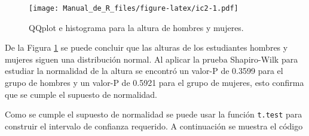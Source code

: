 \documentclass[10pt,]{krantz}
\makeatletter
\newenvironment{Shaded}{\begin{snugshade}}{\end{snugshade}}
\newcommand{\KeywordTok}[1]{\textcolor[rgb]{0.13,0.29,0.53}{\textbf{{#1}}}}
\newcommand{\DataTypeTok}[1]{\textcolor[rgb]{0.13,0.29,0.53}{{#1}}}
\newcommand{\DecValTok}[1]{\textcolor[rgb]{0.00,0.00,0.81}{{#1}}}
\newcommand{\StringTok}[1]{\textcolor[rgb]{0.31,0.60,0.02}{{#1}}}
\newcommand{\CommentTok}[1]{\textcolor[rgb]{0.56,0.35,0.01}{\textit{{#1}}}}
\newcommand{\NormalTok}[1]{{#1}}
\newenvironment{kframe}{%
\medskip{}
\setlength{\fboxsep}{.8em}
 \def\at@end@of@kframe{}%
 \ifinner\ifhmode%
  \def\at@end@of@kframe{\end{minipage}}%
  \begin{minipage}{\columnwidth}%
 \fi\fi%
 \def\FrameCommand##1{\hskip\@totalleftmargin \hskip-\fboxsep
 \colorbox{shadecolor}{##1}\hskip-\fboxsep
     \hskip-\linewidth \hskip-\@totalleftmargin \hskip\columnwidth}%
 \MakeFramed {\advance\hsize-\width
   \@totalleftmargin\z@ \linewidth\hsize
   \@setminipage}}%
 {\par\unskip\endMakeFramed%
 \at@end@of@kframe}
\renewenvironment{Shaded}{\begin{kframe}}{\end{kframe}}
\makeatother
\begin{document}
\begin{Shaded}
\end{Shaded}

\begin{figure}[htbp]
\centering
\texttt{[image: Manual\_de\_R\_files/figure-latex/ic2-1.pdf]}
\caption{\label{fig:ic2}QQplot e histograma para la altura de hombres y
mujeres.}
\end{figure}

De la Figura \ref{fig:ic2} se puede concluir que las alturas de los
estudiantes hombres y mujeres siguen una distribución normal. Al aplicar
la prueba Shapiro-Wilk para estudiar la normalidad de la altura se
encontró un valor-P de 0.3599 para el grupo de hombres y un valor-P de
0.5921 para el grupo de mujeres, esto confirma que se cumple el supuesto
de normalidad.

Como se cumple el supuesto de normalidad se puede usar la función
\texttt{t.test} para construir el intervalo de confianza requerido. A
continuación se muestra el código
\end{document}
